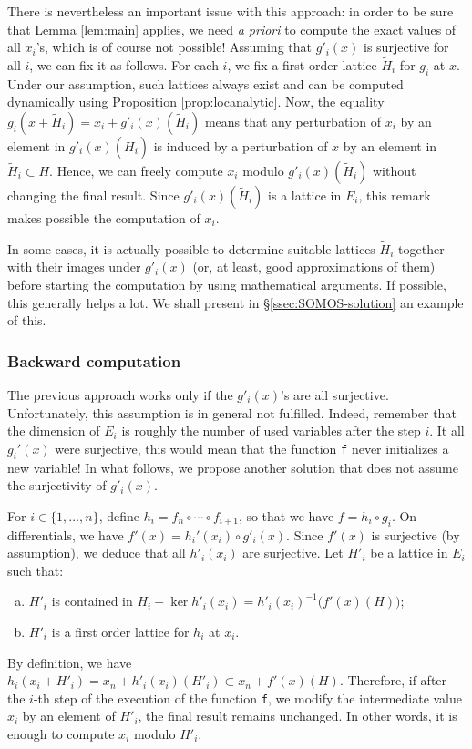 \documentclass{lms}
\begin{document}
There is nevertheless an important issue with this approach: in order to 
be sure that Lemma \ref{lem:main} applies, we need \emph{a priori} to 
compute the exact values of all $x_i$'s, which is of course not 
possible! Assuming that $g'_i(x)$ is surjective for all $i$, we can fix 
it as follows. For each $i$, we fix a first order lattice $\tilde H_i$ 
for $g_i$ at $x$. Under our assumption, such lattices always exist and 
can be computed dynamically using Proposition \ref{prop:locanalytic}. 
Now, the equality $g_i(x + \tilde H_i) = x_i + g'_i(x)(\tilde H_i)$ 
means that any perturbation of $x_i$ by an element in $g'_i(x) (\tilde 
H_i)$ is induced by a perturbation of $x$ by an element in $\tilde H_i 
\subset H$. Hence, we can freely compute $x_i$ modulo $g'_i(x) (\tilde 
H_i)$ without changing the final result. Since $g'_i(x)(\tilde H_i)$ is 
a lattice in $E_i$, this remark makes possible the computation of $x_i$.

\begin{rmk}
In some cases, it is actually possible to determine suitable lattices 
$\tilde H_i$ together with their images under $g'_i(x)$ (or, at
least, good approximations of them) before starting the computation 
by using mathematical arguments. If possible, this generally helps a
lot. We shall present in \S \ref{ssec:SOMOS-solution} an example of 
this.
\end{rmk}

\subsubsection*{Backward computation}

The previous approach works only if the $g'_i(x)$'s are all surjective. 
Unfortunately, this assumption is in general not fulfilled. Indeed, 
remember that the dimension of $E_i$ is roughly the number of used 
variables after the step $i$. It all $g_i'(x)$ were surjective, this 
would mean that the function {\tt f} never initializes a new variable!
In what follows, we propose another solution that does not assume the
surjectivity of $g'_i(x)$.

For $i \in \{1, \ldots, n\}$, define $h_i = f_n \circ \cdots \circ 
f_{i+1}$, so that we have $f = h_i \circ g_i$. On differentials, we 
have $f'(x) = h_i'(x_i) \circ g'_i(x)$. Since $f'(x)$ is surjective (by 
assumption), we deduce that all $h'_i(x_i)$ are surjective. Let $H'_i$ 
be a lattice in $E_i$ such that:
\begin{enumerate}[(a)] 
\item \label{item:Hi1}
$H'_i$ is contained in $H_i + \ker h'_i(x_i) = h'_i(x_i)^{-1}
\big(f'(x)(H)\big)$;
\item \label{item:Hi2}
$H'_i$ is a first order lattice for $h_i$ at $x_i$.
\end{enumerate}
By definition, we have
$h_i(x_i + H'_i) = x_n + h'_i(x_i)(H'_i) \subset x_n + f'(x)(H)$.
Therefore, if after the $i$-th step of the execution of the function
{\tt f}, we modify the intermediate value $x_i$ by an element of
$H'_i$, the final result remains unchanged. In other words, it is
enough to compute $x_i$ modulo $H'_i$.
\end{document}
